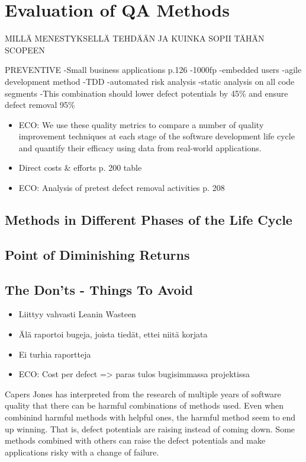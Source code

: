 
 \section{Evaluation of QA Methods}
 
MILLÄ MENESTYKSELLÄ TEHDÄÄN JA KUINKA SOPII TÄHÄN SCOPEEN



PREVENTIVE
-Small business applications p.126
	-1000fp
	-embedded users
	-agile development method
	-TDD
	-automated risk analysis
	-static analysis on all code segments
	-This combination should lower defect potentials by 45\% and ensure defect removal 95\%




 \begin{itemize}
  
 \item ECO: We use these quality metrics to compare a number of quality improvement techniques at each stage of the software development life cycle and quantify their efficacy using data from real-world applications.
 
 \item Direct costs & efforts p. 200 table

 \item ECO: Analysis of pretest defect removal activities p. 208

 \end{itemize}
 
 \subsection{Methods in Different Phases of the Life Cycle}
 
 \subsection{Point of Diminishing Returns}
 
 \subsection{The Don'ts - Things To Avoid}
 
 \begin{itemize}
 
 \item Liittyy vahvasti Leanin Wasteen
 \item Älä raportoi bugeja, joista tiedät, ettei niitä korjata
 \item Ei turhia raportteja
 \item ECO: Cost per defect => paras tulos bugisimmassa projektissa
 
 \end{itemize}


Capers Jones has interpreted from the research of multiple years of software quality that there can be harmful combinations of methods used. Even when combinind harmful methods with helpful ones, the harmful method seem to end up winning. That is, defect potentials are raising instead of coming down. Some methods combined with others can raise the defect potentials and make applications risky with a change of failure.
